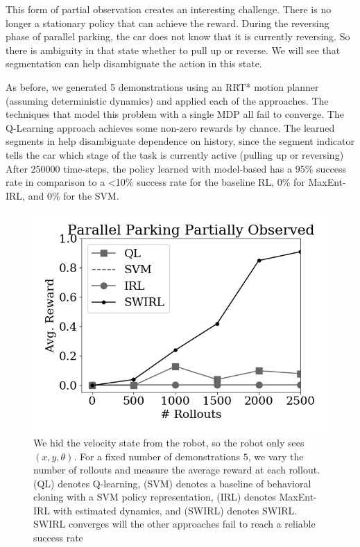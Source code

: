 This form of partial observation creates an interesting challenge.
There is no longer a stationary policy that can achieve the reward.
During the reversing phase of parallel parking, the car does not know that it is currently reversing.
So there is ambiguity in that state whether to pull up or reverse.
We will see that segmentation can help disambiguate the action in this state.

As before, we generated 5 demonstrations using an RRT* motion planner (assuming deterministic dynamics) and applied each of the approaches.
The techniques that model this problem with a single MDP all fail to converge.
The Q-Learning approach achieves some non-zero rewards by chance.
The learned segments in \hirl help disambiguate dependence on history, since the segment indicator tells the car which stage of the task is currently active (pulling up or reversing)
After 250000 time-steps, the policy learned with model-based \hirl has a 95\% success rate in comparison to a <10\% success rate for the baseline RL, 0\% for MaxEnt-IRL, and 0\% for the SVM.


\begin{figure}[ht!]
\centering
 \includegraphics[width=0.8\columnwidth]{swirl-experiments/pp-po.png}
 \caption{We hid the velocity state from the robot, so the robot only sees $(x,y,\theta)$. For a fixed number of demonstrations $5$, we vary the number of rollouts and measure the average reward at each rollout. (QL) denotes Q-learning, (SVM) denotes a baseline of behavioral cloning with a SVM policy representation, (IRL) denotes MaxEnt-IRL with estimated dynamics, and (SWIRL) denotes SWIRL. SWIRL converges will the other approaches fail to reach a reliable success rate \label{exp:pp-po}}
\end{figure}



